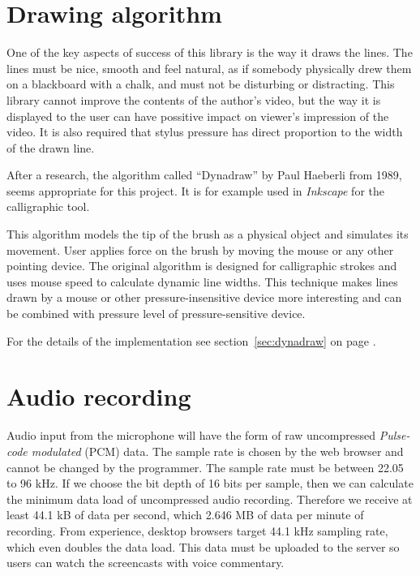\section{Drawing algorithm}
One of the key aspects of success of this library is the way it draws the lines. The lines must be nice, smooth and feel natural, as if somebody physically drew them on a blackboard with a chalk, and must not be disturbing or distracting. This library cannot improve the contents of the author's video, but the way it is displayed to the user can have possitive impact on viewer's impression of the video. It is also required that stylus pressure has direct proportion to the width of the drawn line.

After a research, the algorithm called ``Dynadraw'' by Paul Haeberli \cite{dynadraw} from 1989, seems appropriate for this project. It is for example used in \textit{Inkscape} for the calligraphic tool\cite{inkscape_dynadraw}.

This algorithm models the tip of the brush as a physical object and simulates its movement. User applies force on the brush by moving the mouse or any other pointing device. The original algorithm is designed for calligraphic strokes and uses mouse speed to calculate dynamic line widths. This technique makes lines drawn by a mouse or other pressure-insensitive device more interesting and can be combined with pressure level of pressure-sensitive device.

For the details of the implementation see section~\ref{sec:dynadraw} on page \pageref{sec:dynadraw}.








\section{Audio recording}
Audio input from the microphone will have the form of raw uncompressed \textit{Pulse-code modulated} (PCM) data\cite{mic_pcm}. The sample rate is chosen by the web browser and cannot be changed by the programmer. The sample rate must be between 22.05 to 96 kHz. If we choose the bit depth of 16 bits per sample, then we can calculate the minimum data load of uncompressed audio recording. Therefore we receive at least 44.1 kB of data per second, which 2.646 MB of data per minute of recording. From experience, desktop browsers target 44.1 kHz sampling rate, which even doubles the data load. This data must be uploaded to the server so users can watch the screencasts with voice commentary.

